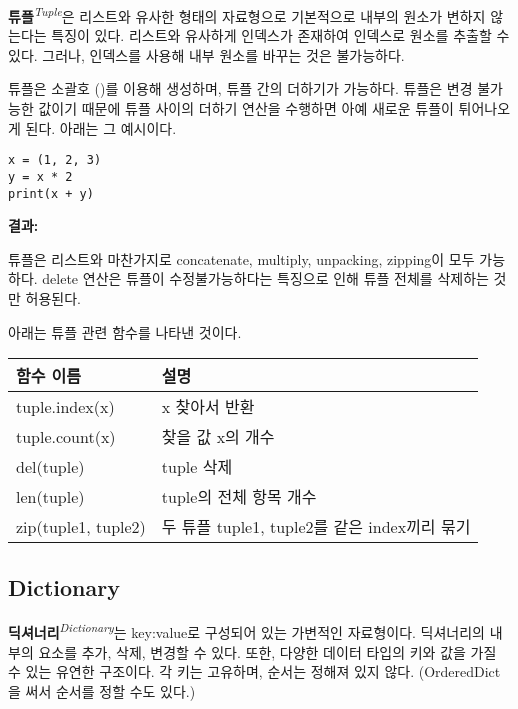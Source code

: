 \textbf{튜플}\textit{\textsuperscript{Tuple}}은 리스트와 유사한 형태의 자료형으로 기본적으로 내부의 원소가 변하지 않는다는 특징이 있다. 리스트와 유사하게 인덱스가 존재하여 인덱스로 원소를 추출할 수 있다. 그러나, 인덱스를 사용해 내부 원소를 바꾸는 것은 불가능하다.

튜플은 소괄호 ()를 이용해 생성하며, 튜플 간의 더하기가 가능하다. 튜플은 변경 불가능한 값이기 때문에 튜플 사이의 더하기 연산을 수행하면 아예 새로운 튜플이 튀어나오게 된다. 아래는 그 예시이다.

\begin{minipage}{\textwidth}
\begin{tcolorbox}[colframe=black, colback=white]
\begin{verbatim}
x = (1, 2, 3)
y = x * 2
print(x + y)
\end{verbatim}
\end{tcolorbox}
\textbf{결과: }
\end{minipage}

튜플은 리스트와 마찬가지로 concatenate, multiply, unpacking, zipping이 모두 가능하다. delete 연산은 튜플이 수정불가능하다는 특징으로 인해 튜플 전체를 삭제하는 것만 허용된다.

아래는 튜플 관련 함수를 나타낸 것이다.

\begin{longtable}[]{@{}p{4cm} p{10cm}@{}}
    \toprule
    함수 이름 & 설명 \\
    \midrule
    \endhead
    tuple.index(x) & x 찾아서 반환 \\
    tuple.count(x) & 찾을 값 x의 개수 \\
    del(tuple) & tuple 삭제 \\
    len(tuple) & tuple의 전체 항목 개수 \\
    zip(tuple1, tuple2) & 두 튜플 tuple1, tuple2를 같은 index끼리 묶기 \\
    \bottomrule
\end{longtable}

\subsection{Dictionary}

\textbf{딕셔너리}\textit{\textsuperscript{Dictionary}}는 key:value로 구성되어 있는 가변적인 자료형이다. 딕셔너리의 내부의 요소를 추가, 삭제, 변경할 수 있다. 또한, 다양한 데이터 타입의 키와 값을 가질 수 있는 유연한 구조이다. 각 키는 고유하며, 순서는 정해져 있지 않다. (OrderedDict을 써서 순서를 정할 수도 있다.)

